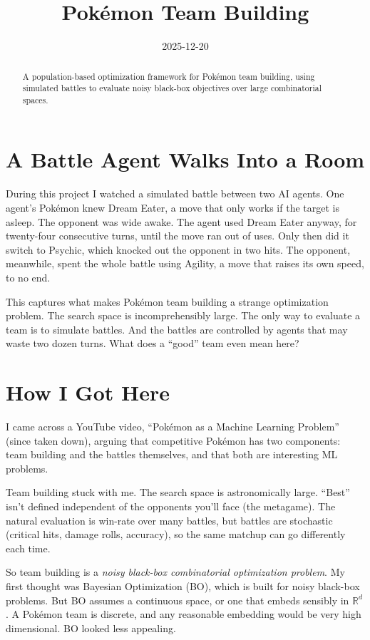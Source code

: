 \documentclass{article}
\title{Pokémon Team Building}
\date{2025-12-20}
\begin{document}
\begin{abstract}
A population-based optimization framework for Pokémon team building, using simulated battles to evaluate noisy black-box objectives over large combinatorial spaces.
\end{abstract}

\section{A Battle Agent Walks Into a Room}

During this project I watched a simulated battle between two AI agents. One agent's Pokémon knew Dream Eater, a move that only works if the target is asleep. The opponent was wide awake. The agent used Dream Eater anyway, for twenty-four consecutive turns, until the move ran out of uses. Only then did it switch to Psychic, which knocked out the opponent in two hits. The opponent, meanwhile, spent the whole battle using Agility, a move that raises its own speed, to no end.

This captures what makes Pokémon team building a strange optimization problem. The search space is incomprehensibly large. The only way to evaluate a team is to simulate battles. And the battles are controlled by agents that may waste two dozen turns. What does a ``good'' team even mean here?

\section{How I Got Here}

I came across a YouTube video, ``Pokémon as a Machine Learning Problem'' (since taken down), arguing that competitive Pokémon has two components: team building and the battles themselves, and that both are interesting ML problems.

Team building stuck with me. The search space is astronomically large. ``Best'' isn't defined independent of the opponents you'll face (the metagame). The natural evaluation is win-rate over many battles, but battles are stochastic (critical hits, damage rolls, accuracy), so the same matchup can go differently each time.

So team building is a \emph{noisy black-box combinatorial optimization problem}. My first thought was Bayesian Optimization (BO), which is built for noisy black-box problems. But BO assumes a continuous space, or one that embeds sensibly in $\mathbb{R}^d$. A Pokémon team is discrete, and any reasonable embedding would be very high dimensional. BO looked less appealing.
\end{document}
